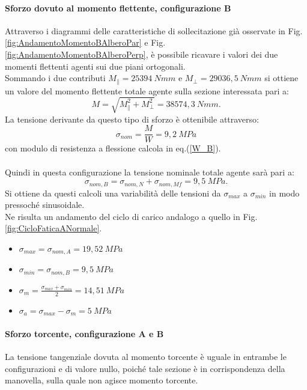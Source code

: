 \paragraph{Sforzo dovuto al momento flettente, configurazione B}Attraverso i diagrammi delle caratteristiche di sollecitazione già osservate in Fig.\ref{fig:AndamentoMomentoBAlberoPar} e Fig.\ref{fig:AndamentoMomentoBAlberoPerp}, è possibile ricavare i valori dei due momenti flettenti agenti sui due piani ortogonali.\\ 
Sommando i due contributi $M_{\parallel}=25394\ Nmm$ e $M_{\perp}=29036,5\ Nmm$ si ottiene un valore del momento flettente totale agente sulla sezione interessata pari a:
\begin{equation}
    M=\sqrt{M_{\parallel}^2+M_{\perp}^2}=38574,3\ Nmm.
\end{equation}
La tensione derivante da questo tipo di sforzo è ottenibile attraverso:
\begin{equation}
    \sigma_{nom}=\frac{M}{W}=9,2\ MPa
\end{equation}
con modulo di resistenza a flessione calcola in eq.(\ref{W_B}).\\
\\
Quindi in questa configurazione la tensione nominale totale agente sarà pari a:
\begin{equation}
    \sigma_{nom,B}=\sigma_{nom,N}+\sigma_{nom,Mf}=9,5\ MPa.
\end{equation}
Si ottiene da questi calcoli una variabilità delle tensioni da $\sigma_{max}$ a $\sigma_{min}$ in modo pressoché sinusoidale.\\
Ne risulta un andamento del ciclo di carico andalogo a quello in Fig.\ref{fig:CicloFaticaANormale}.
\begin{itemize}
    \item $\sigma_{max}=\sigma_{nom,A}=19,52\ MPa$
    \item $\sigma_{min}=\sigma_{nom,B}=9,5\ MPa$
    \item $\sigma_m=\frac{\sigma_{max}+\sigma_{min}}{2}=14,51\ MPa$
    \item $\sigma_a=\sigma_{max}-\sigma_m=5\ MPa$
\end{itemize}
\paragraph{Sforzo torcente, configurazione A e B} La tensione tangenziale dovuta al momento torcente è uguale in entrambe le configurazioni e di valore nullo, poiché tale sezione è in corrispondenza della manovella, sulla quale non agisce momento torcente. 
